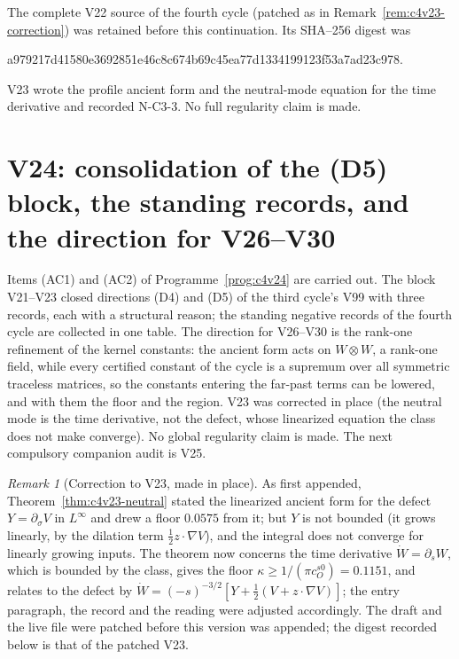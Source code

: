 \documentclass[11pt]{article}
\theoremstyle{plain}
\theoremstyle{definition}
\theoremstyle{remark}
\newtheorem{remark}[theorem]{Remark}
\begin{document}
The complete V22 source of the fourth cycle (patched as in
Remark~\ref{rem:c4v23-correction}) was retained before this
continuation.  Its SHA--256 digest was
\begin{center}\scriptsize\ttfamily
a979217d41580e3692851e46c8c674b69c45ea77d1334199123f53a7ad23c978.
\end{center}
V23 wrote the profile ancient form and the neutral-mode equation for
the time derivative and recorded N-C3-3.  No full regularity claim is made.

\section{V24: consolidation of the (D5) block, the standing records, and the direction for V26--V30}
\label{sec:c4v24-entry}

Items (AC1) and (AC2) of Programme~\ref{prog:c4v24} are carried out.
The block V21--V23 closed directions (D4) and (D5) of the third
cycle's V99 with three records, each with a structural reason; the
standing negative records of the fourth cycle are collected in one
table.  The direction for V26--V30 is the rank-one refinement of the
kernel constants: the ancient form acts on \(W\otimes W\), a rank-one
field, while every certified constant of the cycle is a supremum
over all symmetric traceless matrices, so the constants entering
the far-past terms can be lowered, and with them the floor and the
region.  V23 was corrected in place (the neutral mode is the time
derivative, not the defect, whose linearized equation the class does
not make converge).  No global regularity claim is made.  The next
compulsory companion audit is V25.

\begin{remark}[Correction to V23, made in place]
\label{rem:c4v24-correction}
As first appended, Theorem~\ref{thm:c4v23-neutral} stated the
linearized ancient form for the defect \(Y=\partial_\sigma V\) in \(L^\infty\) and drew a
floor \(0.0575\) from it; but \(Y\) is not bounded (it grows linearly, by the
dilation term \(\frac12z\cdot\nabla V\)), and the integral does not converge for
linearly growing inputs.  The theorem now concerns the time
derivative \(\dot W=\partial_sW\), which is bounded by the class, gives the floor
\(\kappa\ge1/(\pi c_O^{s0})=0.1151\), and relates to the defect by
\(\dot W=(-s)^{-3/2}[Y+\frac12(V+z\cdot\nabla V)]\); the entry paragraph, the record and
the reading were adjusted accordingly.  The draft and the live file
were patched before this version was appended; the digest recorded
below is that of the patched V23.
\end{remark}
\end{document}
